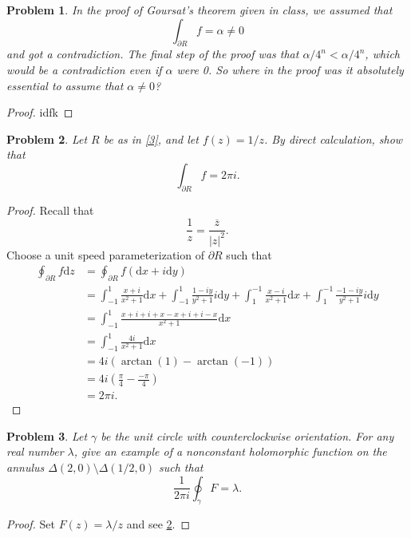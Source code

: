 \documentclass[11pt, letterpaper]{article}
\theoremstyle{plain}
\newtheorem{problem}{Problem}
\begin{document}
\begin{problem}
	In the proof of Goursat's theorem given in class, we assumed that
	\[
		\int_{\partial R} f =\alpha \neq 0
	\]
	and got a contradiction. The final step of the proof was that $\alpha /4^n < \alpha /4^n$, which would be a contradiction even if $\alpha $ were 0. So where in the proof was it absolutely essential to assume that $\alpha \neq 0$?
\end{problem}
\begin{proof}
	idfk
\end{proof}
\begin{problem}\label{4}
	Let $R$ be as in \cref{3}, and let $f(z)=1/z$. By direct calculation, show that
	\[
		\int_{\partial R} f=2\pi i
	.\]
\end{problem}
\begin{proof}
	Recall that
	\[
		\frac{1}{z} =\frac{\overline{z} }{\left| z \right|^2 } 
	.\]
	Choose a unit speed parameterization of $\partial R$ such that
	\begin{align*}
		\oint_{\partial R} f \mathrm{d} z&=\oint_{\partial R} f (\mathrm{d}x+i\mathrm{d} y)\\
						 &=\int_{-1}^{1} \frac{x+i}{x^2+1}  \mathrm{d} x + \int_{-1}^{1} \frac{1-iy}{y^2+1} i\mathrm{d} y + \int_{1}^{-1} \frac{x-i}{x^2+1} \mathrm{d} x + \int_{1}^{-1} \frac{-1-iy}{y^2+1} i\mathrm{d} y\\
						 &=\int_{-1}^{1} \frac{x+i+i+x-x+i+i-x}{x^2+1} \mathrm{d} x\\
						 &=\int_{-1}^{1} \frac{4i}{x^2+1} \mathrm{d} x\\
						 &=4i \left( \arctan (1) - \arctan (-1) \right) \\
						 &=4i\left( \frac{\pi }{4} -\frac{-\pi }{4}  \right) \\
						 &=2\pi i
	.\end{align*}
\end{proof}
\begin{problem}
	Let $\gamma $ be the unit circle with counterclockwise orientation. For any real number $\lambda $, give an example of a nonconstant holomorphic function on the annulus $\Delta (2,0)\setminus \Delta (1/2,0)$ such that
	\[
		\frac{1}{2\pi i} \oint_{\gamma } F = \lambda 
	.\]
\end{problem}
\begin{proof}
	Set $F(z)=\lambda /z$ and see \cref{4}.
\end{proof}
\end{document}
